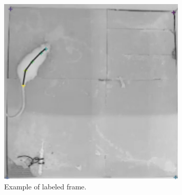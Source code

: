 \begin{enumerate}[label=\alph*.]
\begin{figure}[htbp]
    \includegraphics[width=0.8\textwidth]{Figures/label_frames_ex.png}
    \caption{Example of labeled frame.}
    \label{fig:myfigure}
\end{figure}


\end{enumerate}

